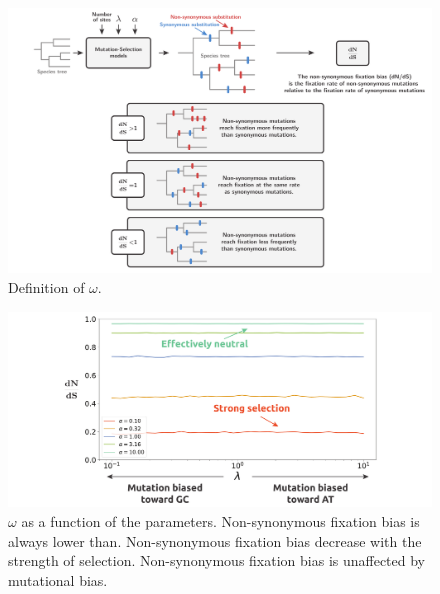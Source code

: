 \begin{figure}[thbp]
	\begin{center}
		\includegraphics[width=\textwidth] {figures/mut-bias-definitions}
	\end{center}
	\caption[Definition of $\omega$]{Definition of $\omega$.}
\end{figure}

\begin{figure}[thbp]
	\begin{center}
		\includegraphics[width=\textwidth] {figures/mut-bias-omega}
	\end{center}
	\caption[$\omega$ as a function of the parameters]{$\omega$ as a function of the parameters. Non-synonymous fixation bias is always lower than. Non-synonymous fixation bias decrease with the strength of selection. Non-synonymous fixation bias is unaffected by mutational bias.}
\end{figure}

